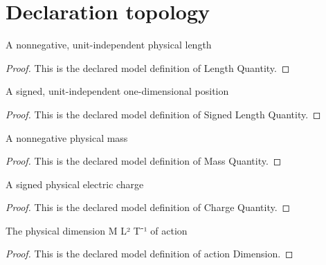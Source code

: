 \section{Declaration topology}
\begin{definition}
  \label{def:physics:phyx-mini-0535:phyxminiproblems-problemphyxmini0535-lengthquantity}
  A nonnegative, unit-independent physical length
\end{definition}
\begin{proof}
  This is the declared model definition of Length Quantity.
\end{proof}
\begin{definition}
  \label{def:physics:phyx-mini-0535:phyxminiproblems-problemphyxmini0535-signedlengthquantity}
  A signed, unit-independent one-dimensional position
\end{definition}
\begin{proof}
  This is the declared model definition of Signed Length Quantity.
\end{proof}
\begin{definition}
  \label{def:physics:phyx-mini-0535:phyxminiproblems-problemphyxmini0535-massquantity}
  A nonnegative physical mass
\end{definition}
\begin{proof}
  This is the declared model definition of Mass Quantity.
\end{proof}
\begin{definition}
  \label{def:physics:phyx-mini-0535:phyxminiproblems-problemphyxmini0535-chargequantity}
  A signed physical electric charge
\end{definition}
\begin{proof}
  This is the declared model definition of Charge Quantity.
\end{proof}
\begin{definition}
  \label{def:physics:phyx-mini-0535:phyxminiproblems-problemphyxmini0535-actiondimension}
  The physical dimension M L² T⁻¹ of action
\end{definition}
\begin{proof}
  This is the declared model definition of action Dimension.
\end{proof}
